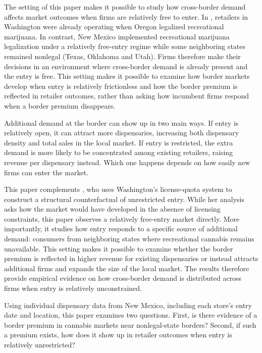 \documentclass[english,12pt]{article}
\begin{document}
The setting of this paper makes it possible to study how cross-border demand affects market outcomes when firms are relatively free to enter. In \cite{HansenMillerWeber2020}, retailers in Washington were already operating when Oregon legalized recreational marijuana.
 In contrast, New Mexico implemented recreational marijuana legalization under a relatively free-entry regime while some neighboring states remained nonlegal (Texas, Oklahoma and Utah). Firms therefore make their decisions in an environment where cross-border demand is already present and the entry is free. This setting makes it possible to examine how border markets develop when entry is relatively frictionless and how the border premium is reflected in retailer outcomes, rather than asking how incumbent firms respond when a border premium disappears.

Additional demand at the border can show up in two main ways. If entry is relatively open, it can attract more dispensaries, increasing both dispensary density and total sales in the local market. If entry is restricted, the extra demand is more likely to be concentrated among existing retailers, raising revenue per dispensary instead. Which one happens depends on how easily new firms can enter the market.

This paper complements \cite{thomas2019license}, who uses Washington's license-quota system to construct a structural counterfactual of unrestricted entry. While her analysis asks how the market would have developed in the absence of licensing constraints, this paper observes a relatively free-entry market directly. More importantly, it studies how entry responds to a specific source of additional demand: consumers from neighboring states where recreational cannabis remains unavailable. This setting makes it possible to examine whether the border premium is reflected in higher revenue for existing dispensaries or instead attracts additional firms and expands the size of the local market. The results therefore provide empirical evidence on how cross-border demand is distributed across firms when entry is relatively unconstrained.


Using individual dispensary data from New Mexico, including each store’s entry date and location, this paper examines two questions. First, is there evidence of a border premium in cannabis markets near nonlegal-state borders? Second, if such a premium exists, how does it show up in retailer outcomes when entry is relatively unrestricted?
\end{document}
